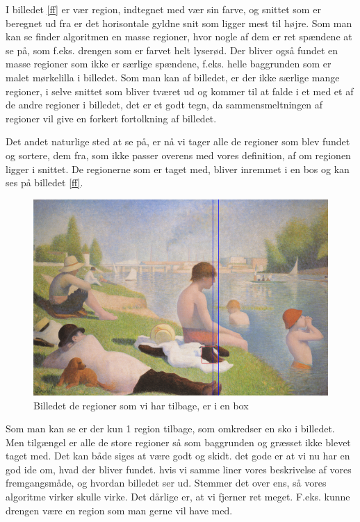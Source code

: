 I billedet \ref{ff} er vær region, indtegnet med vær sin farve, og snittet
som er beregnet ud fra er det horisontale gyldne snit som ligger mest
til højre. Som man kan se finder algoritmen en masse regioner, hvor
nogle af dem er ret spændene at se på, som f.eks. drengen som er farvet
helt lyserød. Der bliver også fundet en masse regioner som ikke er
særlige spændene, f.eks. helle baggrunden som er malet mørkelilla i
billedet. Som man kan af billedet, er der ikke særlige mange regioner, i
selve snittet som bliver tværet ud og kommer til at falde i et med et af
de andre regioner i billedet, det er et godt tegn, da sammensmeltningen af
regioner vil give en forkert fortolkning af billedet.

Det andet naturlige sted at se på, er nå vi tager alle de regioner som
blev fundet og sortere, dem fra, som ikke passer overens med vores
definition, af om regionen ligger i snittet. De regionerne som er taget
med, bliver inremmet i en bos og kan ses på billedet \ref{ff}. 

\begin{figure}[h!!]
	\begin{center}
		\includegraphics[scale=0.42,angle=0]{afsnit/afprovning/billeder/boindingboxbilledet.png}
	\end{center}
	\caption[]{Billedet de regioner som vi har tilbage, er i en box}
	\label{blob}
\end{figure}

Som man kan se er der kun 1 region tilbage, som omkredser en sko i
billedet. Men tilgængel er alle de store regioner så som baggrunden og
græsset ikke blevet taget med. Det kan både siges at være godt og skidt.
det gode er at vi nu har en god ide om, hvad der bliver fundet. hvis vi
samme liner vores beskrivelse af vores fremgangsmåde, og hvordan
billedet ser ud. Stemmer det over ens, så vores algoritme virker skulle
virke. Det dårlige er, at vi fjerner ret meget. F.eks. kunne drengen
være en region som man gerne vil have med.


